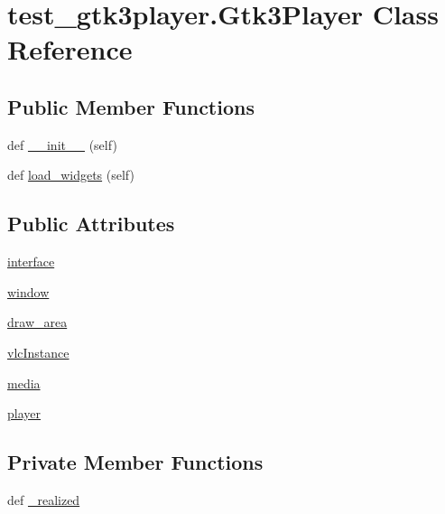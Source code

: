 \hypertarget{classtest__gtk3player_1_1Gtk3Player}{}\section{test\+\_\+gtk3player.\+Gtk3\+Player Class Reference}
\label{classtest__gtk3player_1_1Gtk3Player}
\subsection*{Public Member Functions}
\begin{DoxyCompactItemize}
\item 
def \hyperlink{classtest__gtk3player_1_1Gtk3Player_a33d408cb9126b90e9dc7c46ebd8c1b13}{\+\_\+\+\_\+init\+\_\+\+\_\+} (self)
\item 
def \hyperlink{classtest__gtk3player_1_1Gtk3Player_a99c19aebd27a6e28c540664b2d792ecd}{load\+\_\+widgets} (self)
\end{DoxyCompactItemize}
\subsection*{Public Attributes}
\begin{DoxyCompactItemize}
\item 
\hyperlink{classtest__gtk3player_1_1Gtk3Player_ac39b1df000eb6740f46e3e4fa3fb09e6}{interface}
\item 
\hyperlink{classtest__gtk3player_1_1Gtk3Player_aae28e9f639761f39b771870b77e81aa9}{window}
\item 
\hyperlink{classtest__gtk3player_1_1Gtk3Player_a7b6b7961e8d5236e4ace82786c8bac7d}{draw\+\_\+area}
\item 
\hyperlink{classtest__gtk3player_1_1Gtk3Player_a16f08897aa9bb77848d7dcaafc5abd63}{vlc\+Instance}
\item 
\hyperlink{classtest__gtk3player_1_1Gtk3Player_a9124772b4f2825a36d705745c5205201}{media}
\item 
\hyperlink{classtest__gtk3player_1_1Gtk3Player_aaa28c1539eeb9bff3640043070ddb3cb}{player}
\end{DoxyCompactItemize}
\subsection*{Private Member Functions}
\begin{DoxyCompactItemize}
\item 
def \hyperlink{classtest__gtk3player_1_1Gtk3Player_a3a79cfa8742a4ced754150d08882e63f}{\+\_\+realized}
\end{DoxyCompactItemize}


